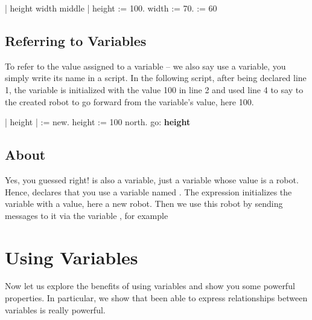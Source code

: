 \begin{nalltt}
| height width middle |
height := 100.
width := 70.
\dist := 60
\end{nalltt}



\subsection*{Referring to Variables}
To refer to the value assigned to a variable \--- we also say use a variable, you simply write its name in a script. In the following script, after being declared line 1, the variable  is initialized  with the value 100 in line 2 and used line 4 to say to the created robot to go forward from the   variable's value, here 100.

\begin{nalltt}
| \caro height |
\caro := \Turtle new.
height := 100
\caro north.
\caro go: \textbf{height}
\end{nalltt}




\subsection*{About \caro}
Yes, you guessed right! \caro is also a variable, just a variable whose value is a robot. Hence, \ct{| \caro |} declares that you use a variable named \ct{\caro}. The expression  initializes the variable with a value, here a new robot. Then we use this robot by sending messages to it via the variable \ct{\caro}, for example 

\section{Using Variables}
Now let us explore the benefits of using variables and show you some powerful properties. In particular, we show that been able to express relationships between variables is really powerful.  

